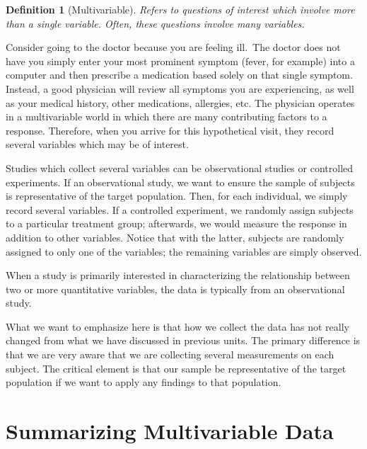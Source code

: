 \documentclass[
]{book}
\theoremstyle{plain}
\theoremstyle{mydefn}
\newtheorem{definition}{Definition}[chapter]
\theoremstyle{myexmpl}
\theoremstyle{remark}
\begin{document}
\begin{definition}[Multivariable]
\protect\hypertarget{def:defn-multivariable}{}{\label{def:defn-multivariable} {} }Refers to questions of interest which involve more than a single variable. Often, these questions involve many variables.
\end{definition}

Consider going to the doctor because you are feeling ill.~The doctor does not have you simply enter your most prominent symptom (fever, for example) into a computer and then prescribe a medication based solely on that single symptom. Instead, a good physician will review all symptoms you are experiencing, as well as your medical history, other medications, allergies, etc. The physician operates in a multivariable world in which there are many contributing factors to a response. Therefore, when you arrive for this hypothetical visit, they record several variables which may be of interest.

Studies which collect several variables can be observational studies or controlled experiments. If an observational study, we want to ensure the sample of subjects is representative of the target population. Then, for each individual, we simply record several variables. If a controlled experiment, we randomly assign subjects to a particular treatment group; afterwards, we would measure the response in addition to other variables. Notice that with the latter, subjects are randomly assigned to only one of the variables; the remaining variables are simply observed.

\begin{rmdtip}
When a study is primarily interested in characterizing the relationship between two or more quantitative variables, the data is typically from an observational study.
\end{rmdtip}

What we want to emphasize here is that how we collect the data has not really changed from what we have discussed in previous units. The primary difference is that we are very aware that we are collecting several measurements on each subject. The critical element is that our sample be representative of the target population if we want to apply any findings to that population.

\hypertarget{Regsummaries}{%
\chapter{Summarizing Multivariable Data}\label{Regsummaries}}
\end{document}
